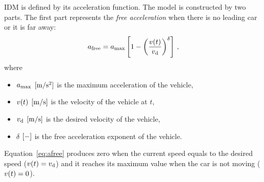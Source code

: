 		IDM is defined by its acceleration function. The model is constructed by two parts. The first part represents the \textit{free acceleration} when there is no leading car or it is far away:
		\begin{equation}
			a_{\rm free}=a_{\rm max}\left [ 1 - \left ( \frac{v(t)}{{v_{\rm d}}} \right )^{\delta} \right ]\,,
			\label{eq:afree}
		\end{equation}
		where
		\begin{itemize}
			\item $a_{\rm max}$ $\rm [m/s^2]$ is the maximum acceleration of the vehicle,
			\item $v(t)$ $\rm [m/s]$ is the velocity of the vehicle at $t$,
			\item ${v_{\rm d}}$ $\rm [m/s]$ is the desired velocity of the vehicle,
			\item $\delta$ $\rm [-]$ is the free acceleration exponent of the vehicle.
		\end{itemize}
		Equation~\eqref{eq:afree} produces zero when the current speed equals to the desired speed ($v(t)={v_{\rm d}}$) and it reaches its maximum value when the car is not moving ($v(t)=0$).

